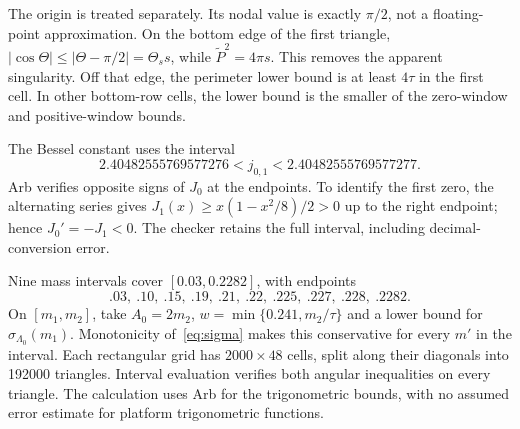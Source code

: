 The origin is treated separately. Its nodal value is exactly $\pi/2$, not a floating-point approximation. On the bottom edge of the first triangle, $|\cos\Theta|\le|\Theta-\pi/2|=\Theta_s s$, while $\widetilde P^2=4\pi s$. This removes the apparent singularity. Off that edge, the perimeter lower bound is at least $4\tau$ in the first cell. In other bottom-row cells, the lower bound is the smaller of the zero-window and positive-window bounds.

The Bessel constant uses the interval
\[
 2.40482555769577276<j_{0,1}<2.40482555769577277.
\]
Arb verifies opposite signs of $J_0$ at the endpoints. To identify the first zero, the alternating series gives $J_1(x)\ge x(1-x^2/8)/2>0$ up to the right endpoint; hence $J_0'=-J_1<0$. The checker retains the full interval, including decimal-conversion error.

Nine mass intervals cover $[0.03,0.2282]$, with endpoints
\[
 .03,\ .10,\ .15,\ .19,\ .21,\ .22,\ .225,\ .227,\ .228,\ .2282.
\]
On $[m_1,m_2]$, take $A_0=2m_2$, $w=\min\{0.241,m_2/\tau\}$ and a lower bound for $\sigma_{\Lambda_0}(m_1)$. Monotonicity of~\eqref{eq:sigma} makes this conservative for every $m'$ in the interval. Each rectangular grid has $2000\times48$ cells, split along their diagonals into 192000 triangles. Interval evaluation verifies both angular inequalities on every triangle. The calculation uses Arb for the trigonometric bounds, with no assumed error estimate for platform trigonometric functions.

